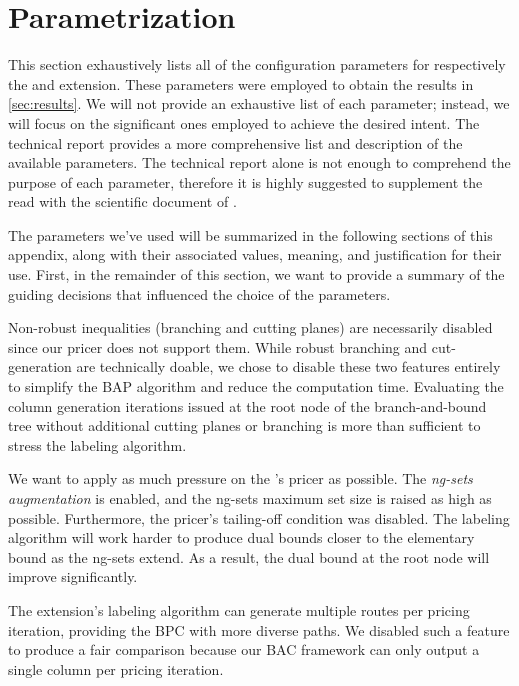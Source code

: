 \chapter{\bapcod{} Parametrization}
\label{sec:bapcod-appendix}

This section exhaustively lists all of the configuration parameters
for respectively the \bapcod{} and \vrpsolver{} extension.
These parameters were employed to obtain the results in \cref{sec:results}.
We will not provide an exhaustive list of each parameter;
instead, we will focus on the significant ones employed to achieve the desired intent.
The \bapcod{} technical report \parencite{sadykov2021}
provides a more comprehensive list and description of the available parameters.
The technical report alone is not enough to comprehend the purpose of each parameter,
therefore it is highly suggested to supplement the read with the scientific document of \textcite{pessoa2020generic}.

\medskip

The parameters we've used will be summarized in the following sections of this appendix,
along with their associated values, meaning, and justification for their use.
First, in the remainder of this section,
we want to provide a summary of the guiding decisions
that influenced the choice of the parameters.

Non-robust inequalities (branching and cutting planes)
are necessarily disabled since our pricer does not support them.
While robust branching and cut-generation are technically doable,
we chose to disable these two features entirely to simplify the BAP algorithm
and reduce the computation time.
Evaluating the column generation iterations issued at the root node
of the branch-and-bound tree without additional cutting planes or branching
is more than sufficient to stress the labeling algorithm.

We want to apply as much pressure on the \vrpsolver{}'s pricer as possible.
The \textit{ng-sets augmentation} \parencite{pessoa2020generic} is enabled,
and the ng-sets maximum set size is raised as high as possible.
Furthermore, the \vrpsolver{} pricer's tailing-off condition was disabled.
The labeling algorithm will work harder to produce dual bounds closer to the elementary bound
as the ng-sets extend.
As a result, the dual bound at the root node will improve significantly.

The \vrpsolver{} extension's labeling algorithm can generate multiple routes
per pricing iteration, providing the BPC with more diverse paths.
We disabled such a feature to produce a fair comparison because our BAC framework
can only output a single column per pricing iteration.

